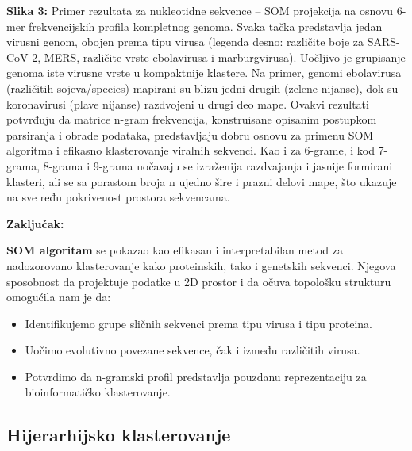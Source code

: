 \documentclass[a4paper,12pt]{article}
\begin{document}
\textbf{Slika 3:} Primer rezultata za nukleotidne sekvence – SOM projekcija na osnovu 6-mer frekvencijskih profila
kompletnog genoma. Svaka tačka predstavlja jedan virusni genom, obojen prema tipu virusa (legenda
desno: različite boje za SARS-CoV-2, MERS, različite vrste ebolavirusa i marburgvirusa). Uočljivo je grupisanje
genoma iste virusne vrste u kompaktnije klastere. Na primer, genomi ebolavirusa (različitih sojeva/species)
mapirani su blizu jedni drugih (zelene nijanse), dok su koronavirusi (plave nijanse) razdvojeni u drugi deo
mape. Ovakvi rezultati potvrđuju da matrice n-gram frekvencija, konstruisane opisanim postupkom
parsiranja i obrade podataka, predstavljaju dobru osnovu za primenu SOM algoritma i efikasno
klasterovanje viralnih sekvenci. Kao i za 6-grame, i kod 7-grama, 8-grama i 9-grama uočavaju se izraženija razdvajanja i jasnije formirani klasteri, ali se sa porastom broja n ujedno šire i prazni delovi mape, što ukazuje na sve ređu pokrivenost prostora sekvencama.

\vspace{200pt}
\textbf{Zaključak:}

\vspace{10pt}
\textbf{SOM algoritam} se pokazao kao efikasan i interpretabilan metod za nadozorovano klasterovanje kako proteinskih, tako i genetskih sekvenci. Njegova sposobnost da projektuje podatke u 2D prostor i da očuva topološku strukturu omogućila nam je da:

\begin{itemize}
    \item Identifikujemo grupe sličnih sekvenci prema tipu virusa i tipu proteina.
    \item Uočimo evolutivno povezane sekvence, čak i između različitih virusa.
    \item Potvrdimo da n-gramski profil predstavlja pouzdanu reprezentaciju za bioinformatičko klasterovanje.
\end{itemize}

\newpage
\subsection{Hijerarhijsko klasterovanje}
\end{document}
